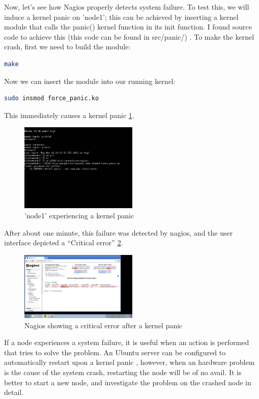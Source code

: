 \documentclass[12pt]{report}
\begin{document}
Now, let's see how Nagios properly detects system failure. To test
this, we will induce a kernel panic on 'node1'; this can be achieved
by inserting a kernel module that calls the panic() kernel function in
its init function. I found source code to achieve this (this code can
be found in src/panic/) \cite{simulate_linux_crash}.
To make the kernel crash, first we need to build the module:
\begin{lstlisting}[language=bash]
 make
\end{lstlisting} 
Now we can insert the module into our running kernel:
\begin{lstlisting}[language=bash]
 sudo insmod force_panic.ko
\end{lstlisting} 
This immediately causes a kernel panic \cref{fig:kernel_panic}.
\begin{figure}[h!]
  \caption{'node1' experiencing a kernel panic}
  \label{fig:kernel_panic}
  \centering
    \includegraphics[width=0.5\textwidth]{pics/kernel_panic.png}
\end{figure}
After about one minute, this failure was detected by nagios, and the
user interface depicted a ``Critical error'' \cref{fig:nagios_after_kernel_panic}.

\begin{figure}[h!]
  \caption{Nagios showing a critical error after a kernel panic}
  \label{fig:nagios_after_kernel_panic}
  \centering
    \includegraphics[width=0.5\textwidth]{pics/nagios_after_kernel_panic.png}
\end{figure}

If a node experiences a system failure, it is useful when an action is
performed that tries to solve the problem. An Ubuntu server can be
configured to automatically restart upon a kernel panic
\cite{restart_upon_kernel_panic}, however, when an hardware problem is
the cause of the system crash, restarting the node will be of no
avail. It is better to start a new node, and investigate the problem
on the crashed node in detail.
\end{document}
